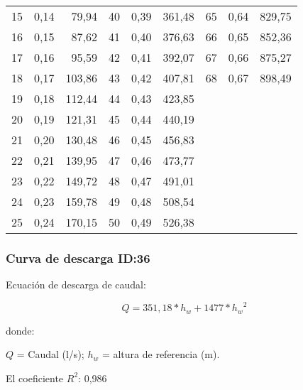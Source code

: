 \documentclass[]{article}
\begin{document}
\begin{table}[H]
\begin{center}
\begin{tabular}{rcrrcrrcr}
   15 & 0,14 & 79,94 &  40 & 0,39 & 361,48 &  65 & 0,64 & 829,75 \\ 
   16 & 0,15 & 87,62 &  41 & 0,40 & 376,63 &  66 & 0,65 & 852,36 \\ 
   17 & 0,16 & 95,59 &  42 & 0,41 & 392,07 &  67 & 0,66 & 875,27 \\ 
   18 & 0,17 & 103,86 &  43 & 0,42 & 407,81 &  68 & 0,67 & 898,49 \\ 
   19 & 0,18 & 112,44 &  44 & 0,43 & 423,85 &  &  &  \\ 
   20 & 0,19 & 121,31 &  45 & 0,44 & 440,19 &  &  &  \\ 
   21 & 0,20 & 130,48 &  46 & 0,45 & 456,83 &  &  &  \\ 
   22 & 0,21 & 139,95 &  47 & 0,46 & 473,77 &  &  &  \\ 
   23 & 0,22 & 149,72 &  48 & 0,47 & 491,01 &  &  &  \\ 
   24 & 0,23 & 159,78 &  49 & 0,48 & 508,54 &  &  &  \\ 
   25 & 0,24 & 170,15 &  50 & 0,49 & 526,38 &  &  &  \\ 
   \hline
\end{tabular}
\endgroup\end{center}
\end{table}

\clearpage

\subsubsection{Curva de descarga ID:36}\label{ID:36}

Ecuación de descarga de caudal:

\[Q = 351,18* h_w + 1477*{{h_w}^2}\]

donde:

\(Q\) = Caudal (l/s); \(h_w\) = altura de referencia (m).

El coeficiente \(R^2\): 0,986
\end{document}
